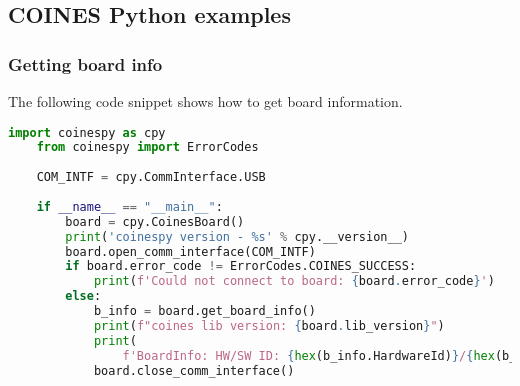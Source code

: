 \documentclass{article}
\begin{document}
\subsection{COINES Python examples}

\subsubsection{Getting board info}\label{GettingBoardInfo}
The following code snippet shows how to get board information.
\begin{lstlisting}[language=python]
	import coinespy as cpy
	from coinespy import ErrorCodes
	
	COM_INTF = cpy.CommInterface.USB
	
	if __name__ == "__main__":
		board = cpy.CoinesBoard()
		print('coinespy version - %s' % cpy.__version__)
		board.open_comm_interface(COM_INTF)
		if board.error_code != ErrorCodes.COINES_SUCCESS:
			print(f'Could not connect to board: {board.error_code}')
		else:
			b_info = board.get_board_info()
			print(f"coines lib version: {board.lib_version}")
			print(
				f'BoardInfo: HW/SW ID: {hex(b_info.HardwareId)}/{hex(b_info.SoftwareId)}')
			board.close_comm_interface()
\end{lstlisting}
\end{document}
